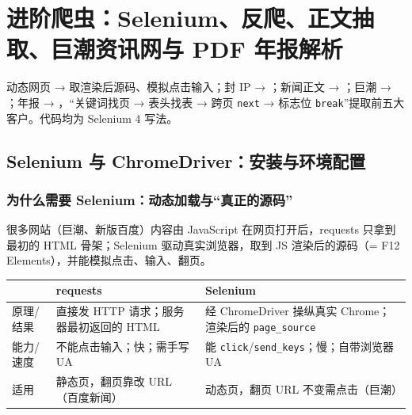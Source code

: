 \chapter{进阶爬虫：Selenium、反爬、正文抽取、巨潮资讯网与 PDF 年报解析}
\begingroup\sloppy\setlength{\emergencystretch}{3em}
\newenvironment{tabD07}{\par\smallskip\noindent\footnotesize}{\par\smallskip}
\noindent{}\quad 动态网页 →  取渲染后源码、模拟点击输入；封 IP → ；新闻正文 → ；巨潮 → ；年报 → ，“关键词找页 → 表头找表 → 跨页 \texttt{next} → 标志位 \texttt{break}”提取前五大客户。代码均为 Selenium 4 写法。

\section{Selenium 与 ChromeDriver：安装与环境配置}

\subsection{为什么需要 Selenium：动态加载与“真正的源码”}
很多网站（巨潮、新版百度）内容由 JavaScript 在网页打开后，requests 只拿到最初的 HTML 骨架；Selenium 驱动真实浏览器，取到 JS 渲染后的源码（= F12 Elements），并能模拟点击、输入、翻页。
\begin{tabD07}
\begin{tabularx}{\linewidth}{@{}p{1.3cm}LL@{}}
\toprule
 & requests & Selenium \\
\midrule
原理/结果 & 直接发 HTTP 请求；服务器最初返回的 HTML & 经 ChromeDriver 操纵真实 Chrome；渲染后的 \texttt{page\_source} \\
能力/速度 & 不能点击输入；快；需手写 UA & 能 \texttt{click}/\texttt{send\_keys}；慢；自带浏览器 UA \\
适用 & 静态页，翻页靠改 URL（百度新闻）& 动态页，翻页 URL 不变需点击（巨潮）\\
\bottomrule
\end{tabularx}
\end{tabD07}

